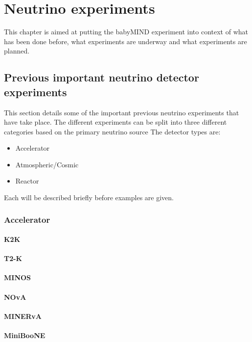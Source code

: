 \chapter{Neutrino  experiments}
\label{c:expIntro}

This chapter is aimed at putting the babyMIND experiment into context of what has been done before, what experiments are underway and what experiments are planned.

\section{Previous important neutrino detector experiments}

This section details some of the important previous neutrino experiments that have take place. The different experiments can be split into three different categories based on the primary neutrino source
The detector types are:
\begin{itemize}
\item Accelerator
\item Atmospheric/Cosmic
\item Reactor
\end{itemize}
Each will be described briefly before examples are given.

\subsection{Accelerator}
\subsubsection{K2K}
\subsubsection{T2-K}
\subsubsection{MINOS}
\subsubsection{NOvA}
\subsubsection{MINERvA}
\subsubsection{MiniBooNE}

